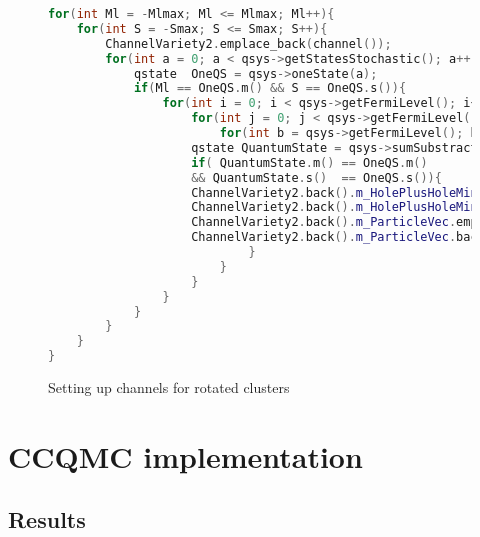 \documentclass[twoside,english]{uiofysmaster}
\theoremstyle{definition}
\begin{document}
\begin{figure}
	\begin{lstlisting}[language=C++]
for(int Ml = -Mlmax; Ml <= Mlmax; Ml++){
   	for(int S = -Smax; S <= Smax; S++){
   		ChannelVariety2.emplace_back(channel());
   		for(int a = 0; a < qsys->getStatesStochastic(); a++){
   			qstate  OneQS = qsys->oneState(a);
   			if(Ml == OneQS.m() && S == OneQS.s()){
   				for(int i = 0; i < qsys->getFermiLevel(); i++){
   					for(int j = 0; j < qsys->getFermiLevel(); j++){
  						for(int b = qsys->getFermiLevel(); b < qsys->getStatesStochastic(); b++){
					qstate QuantumState = qsys->sumSubstractState(i,j,b);
					if( QuantumState.m() == OneQS.m()
					&& QuantumState.s()  == OneQS.s()){
					ChannelVariety2.back().m_HolePlusHoleMinusParticleVec.emplace_back(channelindexpair());
					ChannelVariety2.back().m_HolePlusHoleMinusParticleVec.back().setThree(i, j, b);
					ChannelVariety2.back().m_ParticleVec.emplace_back(channelindexpair());
					ChannelVariety2.back().m_ParticleVec.back().setOne(a);
  							}
   						}
   					}
   				}
   			}
   		}
   	}
}
\end{lstlisting}
\caption{Setting up channels for rotated clusters} \label{f:vectors_for_Q4}
\end{figure}

\section{CCQMC implementation}


\subsection{Results}
\end{document}
